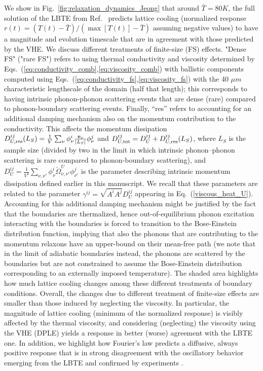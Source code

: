 \documentclass[
prb,
twocolumn,
superscriptaddress,
 amsmath,amssymb,
 aps,
longbibliography,
]{revtex4-2}
\begin{document}
We show in Fig.~\ref{fig:relaxation_dynamics_Jeong} that around $\bar{T}=80 K$, the full solution of the LBTE from Ref.~\cite{Jeong2021} predicts lattice cooling (normalized response $r(t){=}(T(t){-}\bar{T})/(\max[T(t)]{-}\bar{T})$ assuming negative values) to have a magnitude and evolution timescale that are in agreement with those predicted by the VHE. We discuss different treatments of finite-size (FS) effects. "Dense FS" ("rare FS") refers to using thermal conductivity and viscosity determined by Eqs.~(\ref{eq:conductivity_comb},\ref{eq:viscosity_comb}) with ballistic components computed using Eqs.~(\ref{eq:conductivity_fs},\ref{eq:viscosity_fs}) with the 40 $\mu m$ characteristic lengthscale of the domain (half that length); this corresponds to having intrinsic phonon-phonon scattering events that are dense (rare) compared to phonon-boundary scattering events\cite{carruthers_theory_1961,cepellotti_transport_2017}.
Finally, “res” refers to accounting for an additional damping mechanism also on the momentum contribution to the conductivity. This affects the momentum dissipation \cite{Simoncelli2020}
 $D^{ij}_{U,{\rm res}}(L_S)=\frac{1}{V}\sum_{\nu} \phi^i_\nu \frac{\bm{v}_\nu}{|L_S|} \phi^j_{\nu}$ and $D^{ij}_{U,{\rm tot}}=D^{ij}_{U}+D^{ij}_{U,{\rm res}}(L_S)$, where $L_S$ is the sample size (divided by two in the limit in which intrinsic phonon–phonon scattering is rare compared to phonon-boundary scattering), and $D^{ij}_U=\frac{1}{V^2}\sum_{\nu,\nu'} \phi^i_\nu \breve{\Omega}^{U}_{\nu,\nu'} \phi^j_{\nu'}$ is the parameter describing intrinsic momentum dissipation defined earlier in this manuscript. We recall that these parameters are related to the parameter $\gamma^{ij}{=}\sqrt{A^i A^j} D_U^{ij}$ appearing in Eq.~(\ref{viscous_heat_U}).
Accounting for this additional damping mechanism might be justified by the fact that the boundaries are thermalized, hence out-of-equilibrium phonon excitation interacting with the boundaries is forced to transition to the Bose-Einstein distribution function, implying that also the phonons that are contributing to the momentum relaxons have an upper-bound on their mean-free path (we note that in the limit of adiabatic boundaries instead, the phonons are scattered by the boundaries but are not constrained to assume the Bose-Einstein distribution corresponding to an externally imposed temperature).
The shaded area highlights how much lattice cooling changes among these different treatments of boundary conditions. Overall, the changes due to different treatment of finite-size effects are smaller than those induced by neglecting the viscosity. In particular, the magnitude of lattice cooling (minimum of the normalized response) is visibly affected by the thermal viscosity, and considering (neglecting) the viscosity using the VHE (DPLE) yields a response in better (worse) agreement with the LBTE one.
In addition, we highlight how Fourier's law predicts a diffusive, always positive response that is in strong disagreement with the oscillatory behavior emerging from the LBTE and confirmed by experiments \cite{Jeong2021}.
\end{document}
